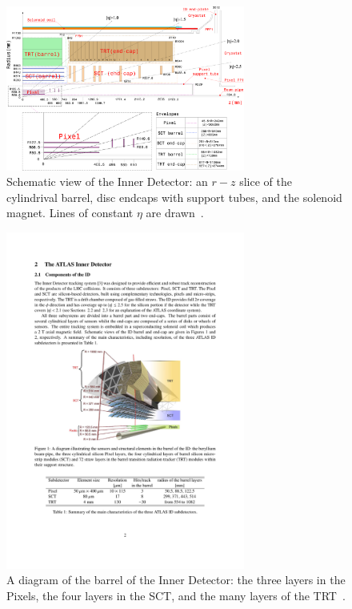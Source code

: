 \begin{figure}[tp]
  \centering
  \includegraphics[width=0.7\textwidth]{fig/atlas/id-schem}
  \caption{Schematic view of the Inner Detector: an $r-z$ slice of the cylindrival barrel, disc endcaps with support tubes, and the solenoid magnet. Lines of constant $\eta$ are drawn~\cite{cern-jinst-atlas}.}
  \label{fig:id-scheme}
\end{figure}
\begin{figure}[tp]
  \centering
  \includegraphics[width=0.7\textwidth]{fig/atlas/id-barrel}
  \caption{A diagram of the barrel of the Inner Detector: the three layers in the Pixels, the four layers in the SCT, and the many layers of the TRT~\cite{cern-jinst-atlas}.}
  \label{fig:id-barrel}
\end{figure}
